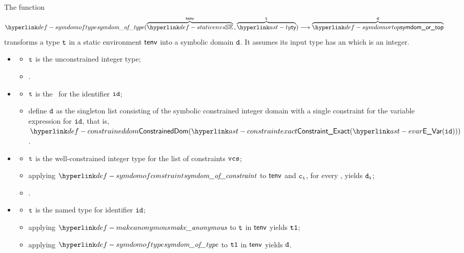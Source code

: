\hypertarget{def-symdomoftype}{}
The function
\[
  \symdomoftype(\overname{\staticenvs}{\tenv} \aslsep \overname{\ty}{\vt}) \aslto \overname{\symdomortop}{\vd}
\]
transforms a type $\texttt{t}$ in a static environment $\textsf{tenv}$ into a symbolic domain $\texttt{d}$.
It assumes its input type has an \underlyingtype{} which is an integer.
\ProseParagraph
\OneApplies
\begin{itemize}
  \item {}
  \begin{itemize}
    \item $\texttt{t}$ is the unconstrained integer type;
    \item {}.
  \end{itemize}

  \item {}
  \begin{itemize}
    \item $\texttt{t}$ is the \parameterizedintegertype\ for the identifier $\texttt{id}$;
    \item define $\texttt{d}$ as the singleton list consisting of the
          symbolic constrained integer domain with a single constraint for the variable expression for $\texttt{id}$,
          that is, \\ $\ConstrainedDom(\ConstraintExact(\EVar(\id)))$.
  \end{itemize}

  \item {}
  \begin{itemize}
    \item $\texttt{t}$ is the well-constrained integer type for the list of constraints $\vcs$;
    \item applying $\symdomofconstraint$ to $\textsf{tenv}$ and $\texttt{c}_{\texttt{i}}$, for every \Proselistrange{$\vi$}{$\vcs$},
          yields $\texttt{d}_{\texttt{i}}$;
    \item {}.
  \end{itemize}

  \item {}
  \begin{itemize}
    \item $\texttt{t}$ is the named type for identifier $\texttt{id}$;
    \item applying $\makeanonymous$ to $\texttt{t}$ in $\textsf{tenv}$ yields $\texttt{t1}$;
    \item applying $\symdomoftype$ to $\texttt{t1}$ in $\textsf{tenv}$ yields $\texttt{d}$.
  \end{itemize}
\end{itemize}

